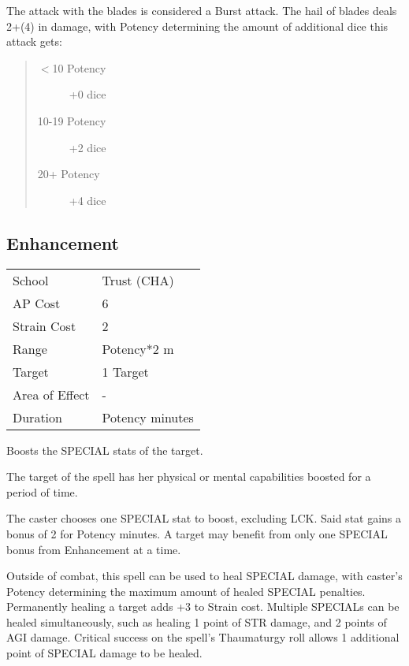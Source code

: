 \documentclass[11pt,a4paper,twocolumn]{book}
\begin{document}
The attack with the blades is considered a Burst attack. The hail of blades deals 2+(4) in damage, with Potency determining the amount of additional dice this attack gets:

\begin{quote}
	\begin{description}
		\item[$<$10 Potency] 	+0 dice
		\item[10-19 Potency] 	+2 dice
		\item[20+ Potency] 	    +4 dice
	\end{description}
\end{quote}




\subsection*{Enhancement}
{
	\begin{tabu} to 75mm{| X[l,4] | X[l,7] |}
		\hline
		School 			& Trust (CHA) 		\\
		AP Cost	      	& 6 					\\
		Strain Cost     & 2 					\\
		Range     		& Potency*2 m			\\
		Target      	& 1 Target				\\
		Area of Effect  & -  	 				\\
		Duration     	& Potency minutes 		\\ \hline
	\end{tabu}
	
}

\medskip

Boosts the SPECIAL stats of the target.

The target of the spell has her physical or mental capabilities boosted for a period of time.

The caster chooses one SPECIAL stat to boost, excluding LCK. Said stat gains a bonus of 2 for Potency minutes. A target may benefit from only one SPECIAL bonus from Enhancement at a time.

Outside of combat, this spell can be used to heal SPECIAL damage, with caster's Potency determining the maximum amount of healed SPECIAL penalties. Permanently healing a target adds +3 to Strain cost. Multiple SPECIALs can be healed simultaneously, such as healing 1 point of STR damage, and 2 points of AGI damage. Critical success on the spell's Thaumaturgy roll allows 1 additional point of SPECIAL damage to be healed.
\end{document}
